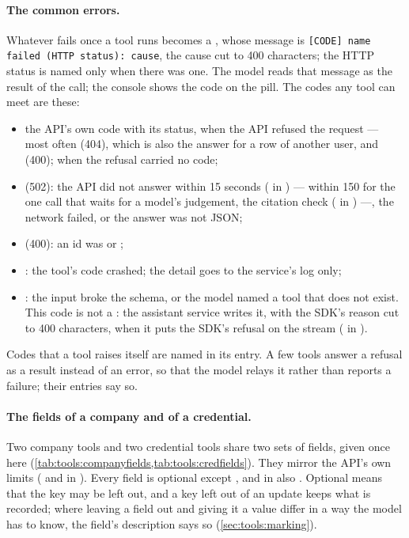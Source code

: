 \paragraph{The common errors.} Whatever fails once a tool runs becomes a ,
whose message is \texttt{[CODE] name failed (HTTP status): cause}, the cause cut to 400
characters; the HTTP status is named only when there was one. The model reads that message as the result of the call; the console shows the code
on the pill. The codes any tool can meet are these:

\begin{itemize}
  \item the API's own code with its status, when the API refused the request --- most often
     (404), which is also the answer for a row of another user, and
     (400);  when the refusal carried no code;
  \item {} (502): the API did not answer within 15 seconds
    ( in ) --- within 150 for the one call that
    waits for a model's judgement, the citation check ( in
    ) ---, the network failed, or the answer was not JSON;
  \item {} (400): an id was  or ;
  \item {}: the tool's code crashed; the detail goes to the service's log
    only;
  \item {}: the input broke the schema, or the model named a tool that
    does not exist. This code is not a : the assistant service writes it,
    with the SDK's reason cut to 400 characters, when it puts the SDK's refusal on the stream
    ( in ).
\end{itemize}

Codes that a tool raises itself are named in its entry. A few tools answer a refusal as a
result instead of an error, so that the model relays it rather than reports a failure; their
entries say so.

\paragraph{The fields of a company and of a credential.} Two company tools and two credential
tools share two sets of fields, given once here (\cref{tab:tools:companyfields,tab:tools:credfields}).
They mirror the API's own limits ( and  in
). Every field is optional except , and in
 also . Optional means that the key may be left out, and a key
left out of an update keeps what is recorded; where leaving a field out and giving it a value
differ in a way the model has to know, the field's description says so
(\cref{sec:tools:marking}).

